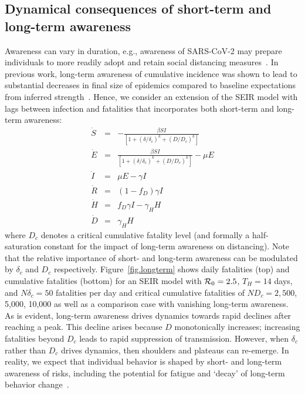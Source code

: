 \subsection{Dynamical consequences of short-term and long-term awareness}
Awareness can vary in duration, e.g., awareness
of SARS-CoV-2 may prepare individuals to more
readily adopt and retain
social distancing measures~\citep{chen_2020social,leung_lancet2020}.  
In previous
work, long-term awareness of cumulative incidence
was shown to lead to substantial decreases
in final size of epidemics compared
to baseline expectations from inferred 
strength~\citep{eksin2019systematic}. Hence, 
we consider an extension of the SEIR model
with lags between infection and fatalities that incorporates
both short-term and long-term awareness:
\begin{eqnarray}
\dot{S} &=& -\frac{\beta SI}{\left[1+\left(\delta/\delta_c\right)^{k}+\left(D/D_c\right)^k\right]}\\
\dot{E} &=& \frac{\beta SI}{\left[1+\left(\delta/\delta_c\right)^{k}+\left(D/D_c\right)^k\right]}-\mu E\\
\dot{I} &=& \mu E-\gamma I \\
\dot{R} &=& (1-f_D)\gamma I\\
\dot{H} &=& f_D\gamma I - \gamma_H H\\
\dot{D} &=& \gamma_H H
\end{eqnarray}
where $D_c$ denotes a critical cumulative fatality level
(and formally a half-saturation constant for the impact
of long-term awareness on distancing).
Note that the relative importance of short- and long-term
awareness can be modulated by $\delta_c$ and $D_c$ respectively.
Figure~\ref{fig.longterm} shows 
daily fatalities (top)
and cumulative fatalities (bottom)
for an SEIR model with ${\cal{R}}_0=2.5$, $T_H=14$ days, and $N\delta_c=50$ 
fatalities per day and critical cumulative fatalities of
$ND_c=2,500$, 5,000, 10,000 as well as a comparison case with vanishing
long-term awareness. As is evident, 
long-term awareness drives dynamics towards rapid declines
after reaching a peak. This decline arises because
$D$ monotonically increases;
increasing fatalities beyond $D_c$ leads to rapid suppression
of transmission.  However, when $\delta_c$ rather than
$D_c$ drives dynamics, then shoulders and plateaus can re-emerge.
In reality, we expect that individual
behavior is shaped by short- and long-term awareness of risks, including
the potential for fatigue and `decay' of long-term behavior
change~\citep{funk2009spread,funk2010modelling}.

